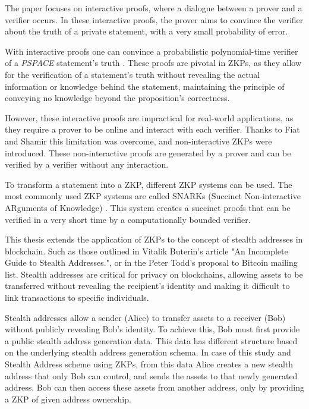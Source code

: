 \documentclass[conference,comsoc,10pt]{IEEEtran}
\begin{document}
    The paper focuses on interactive proofs, where a dialogue between a prover and
    a verifier occurs. In these interactive proofs, the prover aims to convince
    the verifier about the truth of a private statement, with a very small
    probability of error.

    With interactive proofs one can convince a probabilistic polynomial-time verifier
    of a \emph{PSPACE} statement's truth \cite{Shamir1992, Lund1992}. These proofs
    are pivotal in ZKPs, as they allow for the verification of a statement's truth
    without revealing the actual information or knowledge behind the statement,
    maintaining the principle of conveying no knowledge beyond the proposition's
    correctness.

    However, these interactive proofs are impractical for real-world applications, as they
    require a prover to be online and interact with each verifier. Thanks to Fiat
    and Shamir \cite{Fiat} this limitation was overcome, and non-interactive
    ZKPs were introduced. These non-interactive proofs are
    generated by a prover and can be verified by a verifier without any
    interaction.

    To transform a statement into a ZKP, different ZKP systems can be used. The most
    commonly used ZKP systems are called SNARKs (Succinct Non-interactive ARguments
    of Knowledge) \cite{Groth16}. This system creates a succinct proofs that can be
    verified in a very short time by a computationally bounded verifier.

    This thesis extends the application of ZKPs to the concept of stealth
    addresses in blockchain. Such as those outlined in Vitalik Buterin's article "An
    Incomplete Guide to Stealth Addresses."\cite{ButerinIncompleteGuide}, or
    in the Peter Todd's proposal to Bitcoin mailing list\cite{ToddStealthAddresses}.
    Stealth addresses are critical for privacy on blockchains, allowing assets to
    be transferred without revealing the recipient's identity and making
    it difficult to link transactions to specific individuals.

    Stealth addresses allow a sender (Alice) to transfer assets to a receiver
    (Bob) without publicly revealing Bob's identity. To achieve this, Bob must
    first provide a public stealth address generation data. This data has
    different structure based on the underlying stealth address generation
    schema. In case of this study and Stealth Address scheme using ZKPs, from
    this data Alice creates a new stealth address that only Bob can control,
    and sends the assets to that newly generated address. Bob can then access
    these assets from another address, only by providing a ZKP of given address
    ownership.
\end{document}
